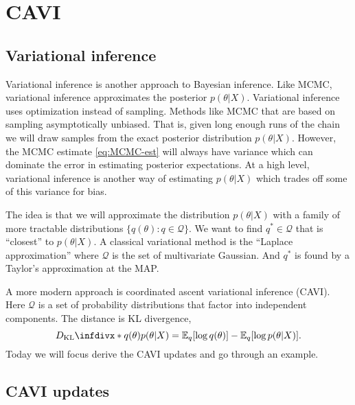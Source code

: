\section{CAVI}

\subsection{Variational inference}

Variational inference is another approach to Bayesian inference. Like MCMC, variational inference approximates the posterior $p(\theta|X)$. Variational inference uses optimization instead of sampling. Methods like MCMC that are based on sampling asymptotically unbiased. That is, given long enough runs of the chain we will draw samples from the exact posterior distribution $p(\theta | X)$. However, the MCMC estimate \eqref{eq:MCMC-est} will always have variance which can dominate the error in estimating posterior expectations. At a high level, variational inference is another way of estimating $p(\theta | X)$ which trades off some of this variance for bias. 

The idea is that we will approximate the distribution $p(\theta| X)$ with a family of more tractable distributions $\{q(\theta) : q \in \mathcal{Q}\}$. We want to find $q^* \in \mathcal{Q}$ that is ``closest'' to $p(\theta |  X)$. A classical variational method is the ``Laplace approximation'' where $\mathcal{Q}$ is the set of multivariate Gaussian. And $q^*$ is found by a Taylor's approximation at the MAP. 

A more modern approach is coordinated ascent variational inference (CAVI). Here $\mathcal{Q}$ is a set of probability distributions that factor into independent components. The distance is KL divergence, 
\[\KLD{q(\theta)}{p(\theta | X)} = \bbE_q[\log q(\theta) ] - \bbE_q[\log p(\theta | X)].\]
Today we will focus derive the CAVI updates and go through an example.

\subsection{CAVI updates}


